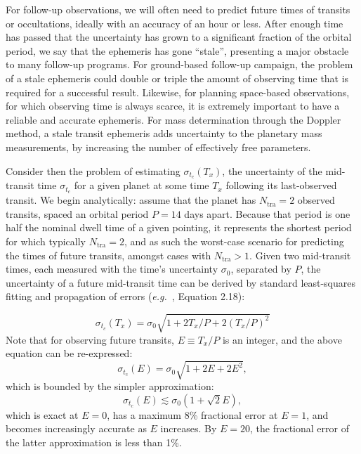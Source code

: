 For follow-up observations, we will often need to predict future times
of transits or occultations, ideally with an accuracy of an hour or
less. After enough time has passed that the uncertainty has grown to a
significant fraction of the orbital period, we say that the ephemeris
has gone ``stale'', presenting a major obstacle to many follow-up
programs. For \tesss ground-based follow-up campaign, the problem of a
stale ephemeris could double or triple the amount of observing time
that is required for a successful result.  Likewise, for planning
space-based observations, for which observing time is always scarce,
it is extremely important to have a reliable and accurate ephemeris.
For mass determination through the Doppler method, a stale transit
ephemeris adds uncertainty to the planetary mass measurements, by
increasing the number of effectively free parameters.

Consider then the problem of estimating $\sigma_{t_c}(T_x)$, the
uncertainty of the mid-transit time $\sigma_{t_c}$ for a given planet
at some time $T_x$ following its last-observed transit.  We begin
analytically: assume that the planet has $N_\mathrm{tra}=2$ observed
transits, spaced an orbital period $P=14$ days apart. Because that
period is one half the nominal \tess dwell time of a given pointing,
it represents the shortest period for which typically
$N_\mathrm{tra}=2$, and as such the worst-case scenario for predicting
the times of future transits, amongst cases with $N_\mathrm{tra}>1$.
Given two mid-transit times, each measured with the time's uncertainty
$\sigma_0$, separated by $P$, the uncertainty of a future mid-transit
time can be derived by standard least-squares fitting and propagation
of errors (\textit{e.g.}~\citet{lyons_practical_1991}, Equation 2.18):

\begin{equation}
	\sigma_{t_c}(T_x) = \sigma_0 \sqrt{1 + 2 T_x / P + 2 (T_x / P)^2 }
\end{equation}
Note that for observing future transits, $E \equiv T_x / P$ is an integer, and the above equation can be re-expressed:
\begin{equation}
	\sigma_{t_c}(E) = \sigma_0 \sqrt{1 + 2 E + 2 E^2 },
\end{equation}
which is bounded by the simpler approximation: 
\begin{equation}
	\sigma_{t_c}(E) \lesssim \sigma_0 \left(1+\sqrt{2} E\right), 
\end{equation}
which is exact at $E=0$, has a maximum 8\% fractional error at $E=1$, and becomes increasingly accurate as $E$ increases. By $E=20$, the fractional error of the latter approximation is less than 1\%.

